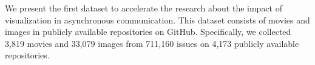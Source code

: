 We present the first dataset to accelerate the research about 
the impact of visualization in asynchronous communication. 
This dataset consists of movies and images 
in publicly available repositories on GitHub. 
Specifically, we collected 
3,819 movies and 
33,079 images from 
711,160 issues on
4,173 publicly available repositories.
